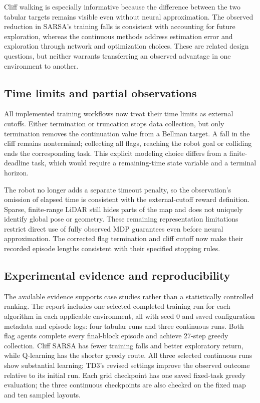 \documentclass[11pt,a4paper]{article}
\theoremstyle{definition}
\theoremstyle{plain}
\theoremstyle{remark}
\begin{document}
Cliff walking is especially informative because the difference between the two tabular targets remains visible even without neural approximation. The observed reduction in SARSA's training falls is consistent with accounting for future exploration, whereas the continuous methods address estimation error and exploration through network and optimization choices. These are related design questions, but neither warrants transferring an observed advantage in one environment to another.

\subsection{Time limits and partial observations}

All implemented training workflows now treat their time limits as external cutoffs. Either termination or truncation stops data collection, but only termination removes the continuation value from a Bellman target. A fall in the cliff remains nonterminal; collecting all flags, reaching the robot goal or colliding ends the corresponding task. This explicit modeling choice differs from a finite-deadline task, which would require a remaining-time state variable and a terminal horizon.

The robot no longer adds a separate timeout penalty, so the observation's omission of elapsed time is consistent with the external-cutoff reward definition. Sparse, finite-range LiDAR still hides parts of the map and does not uniquely identify global pose or geometry. These remaining representation limitations restrict direct use of fully observed MDP guarantees even before neural approximation. The corrected flag termination and cliff cutoff now make their recorded episode lengths consistent with their specified stopping rules.

\subsection{Experimental evidence and reproducibility}

The available evidence supports case studies rather than a statistically controlled ranking. The report includes one selected completed training run for each algorithm in each applicable environment, all with seed 0 and saved configuration metadata and episode logs: four tabular runs and three continuous runs. Both flag agents complete every final-block episode and achieve 27-step greedy collection. Cliff SARSA has fewer training falls and better exploratory return, while Q-learning has the shorter greedy route. All three selected continuous runs show substantial learning; TD3's revised settings improve the observed outcome relative to its initial run. Each grid checkpoint has one saved fixed-task greedy evaluation; the three continuous checkpoints are also checked on the fixed map and ten sampled layouts.
\end{document}
